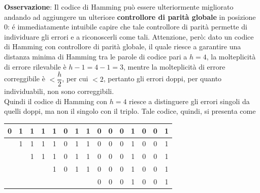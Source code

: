 \documentclass[a4paper]{extarticle}
\renewcommand\arraystretch{}
\begin{document}
\vspace{1em}
\noindent
\textbf{Osservazione}: Il codice di Hamming può essere ulteriormente migliorato andando ad aggiungere un ulteriore \textbf{controllore di parità globale} in posizione $0$: é immediatamente intuibile capire che tale controllore di parità permette di individuare gli errori e a riconoscerli come tali. Attenzione, però: dato un codice di Hamming con controllore di parità globale, il quale riesce a garantire una distanza minima di Hamming tra le parole di codice pari a $h=4$, la molteplicità di errore rilevabile è $h-1=4-1=3$, mentre la molteplicità di errore correggibile è $< \dfrac{h}{2}$, per cui $<2$, pertanto gli errori doppi, per quanto individuabili, non sono correggibili.\\
Quindi il codice di Hamming con $h=4$ riesce a distinguere gli errori singoli da quelli doppi, ma non il singolo con il triplo. Tale codice, quindi, si presenta come

\noindent
\begin{table}[H]
\setlength{\tabcolsep}{4pt}
\renewcommand{\arraystretch}{1.2}
\centering
\begin{tabular}{|c|c|c|c|c|c|c|c|c|c|c|c|c|c|c|}
    \hline
    \cellcolor{orange!75!white}0 & \cellcolor{orange!25!white}1 &\cellcolor{orange!25!white}1 & \cellcolor{orange!25!white}1 & \cellcolor{orange!25!white}1 & \cellcolor{orange!25!white}0 & \cellcolor{orange!25!white}1 & \cellcolor{orange!25!white}1 & \cellcolor{orange!25!white}0 & \cellcolor{orange!25!white}0 & \cellcolor{orange!25!white}0 & \cellcolor{orange!25!white}1 & \cellcolor{orange!25!white}0 & \cellcolor{orange!25!white}0 & \cellcolor{orange!25!white}1\\
    \hline
    &\cellcolor{orange!75!white}1 & 1 & \cellcolor{orange!25!white}1 & 1 & \cellcolor{orange!25!white}0 & 1 & \cellcolor{orange!25!white}1 & 0 & \cellcolor{orange!25!white}0 & 0 & \cellcolor{orange!25!white}1 & 0 & \cellcolor{orange!25!white}0 & 1\\
    \hline
    & & \cellcolor{orange!75!white}1 & \cellcolor{orange!25!white}1 & 1 & 0 & \cellcolor{orange!25!white}1 & \cellcolor{orange!25!white}1 & 0 & 0 & \cellcolor{orange!25!white}0 & \cellcolor{orange!25!white}1 & 0 & 0 & \cellcolor{orange!25!white}1\\
    \hline
    & &  &  & \cellcolor{orange!75!white}1 & \cellcolor{orange!25!white}0 & \cellcolor{orange!25!white}1 & \cellcolor{orange!25!white}1 & 0 & 0 & 0 & 1 & \cellcolor{orange!25!white}0 & \cellcolor{orange!25!white}0 & \cellcolor{orange!25!white}1\\
    \hline
    & &  &  &  &  &  &  & \cellcolor{orange!75!white}0 & \cellcolor{orange!25!white}0 & \cellcolor{orange!25!white}0 & \cellcolor{orange!25!white}1 & \cellcolor{orange!25!white}0 & \cellcolor{orange!25!white}0 & \cellcolor{orange!25!white}1\\
    \hline
\end{tabular}
\end{table}
\end{document}

